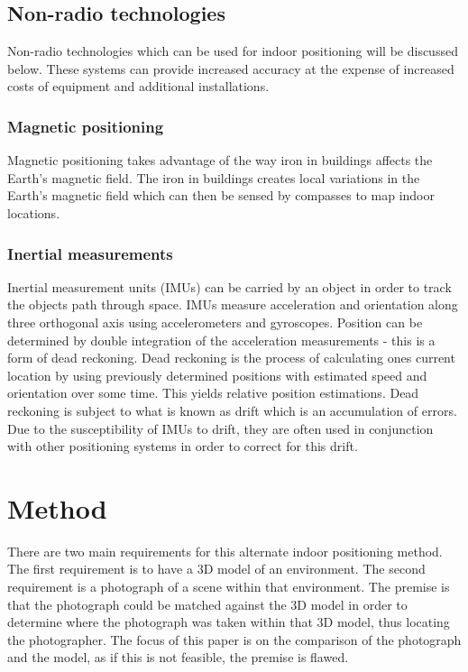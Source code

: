 \documentclass[11pt,a4paper]{report}
\begin{document}
	\section{Non-radio technologies}
		Non-radio technologies which can be used for indoor positioning will be discussed below. These systems can provide increased accuracy at the expense of increased costs of equipment and additional installations.
	
	\subsection{Magnetic positioning}
		Magnetic positioning takes advantage of the way iron in buildings affects the Earth's magnetic field. The iron in buildings creates local variations in the Earth's magnetic field which can then be sensed by compasses to map indoor locations.
		\cite{supreeth_sudhakaran_geospatial_2014}
	
	\subsection{Inertial measurements}
		Inertial measurement units (IMUs) can be carried by an object in order to track the objects path through space. IMUs measure acceleration and orientation along three orthogonal axis using accelerometers and gyroscopes. Position can be determined by double integration of the acceleration measurements - this is a form of dead reckoning. Dead reckoning is the process of calculating ones current location by using previously determined positions with estimated speed and orientation over some time. This yields relative position estimations. Dead reckoning is subject to what is known as drift which is an accumulation of errors. Due to the susceptibility of IMUs to drift, they are often used in conjunction with other positioning systems in order to correct for this drift.

\newpage
\chapter{Method}
	There are two main requirements for this alternate indoor positioning method. The first requirement is to have a 3D model of an environment. The second requirement is a photograph of a scene within that environment. The premise is that the photograph could be matched against the 3D model in order to determine where the photograph was taken within that 3D model, thus locating the photographer. The focus of this paper is on the comparison of the photograph and the model, as if this is not feasible, the premise is flawed.
	
\end{document}
